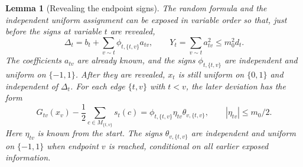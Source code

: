 \documentclass[11pt,a4paper]{article}
\newtheorem{lemma}[theorem]{Lemma}
\theoremstyle{definition}
\theoremstyle{remark}
\begin{document}
\begin{lemma}[Revealing the endpoint signs]\label{lem:random_exposure}
The random formula and the independent uniform assignment can be exposed
in variable order so that, just before the signs at variable $t$ are
revealed,
\[
 \Delta_t=b_t+\sum_{v\sim t}\phi_{t,\{t,v\}}a_{tv},
 \qquad Y_t=\sum_{v\sim t}a_{tv}^2\le m_0^2d_t.
\]
The coefficients $a_{tv}$ are already known, and the signs
$\phi_{t,\{t,v\}}$ are independent and uniform on $\{-1,1\}$. After they
are revealed, $x_t$ is still uniform on $\{0,1\}$ and independent of
$\Delta_t$.
For each edge $\{t,v\}$ with $t<v$, the later deviation has the form
\[
 G_{tv}(x_v)-\frac12\sum_{c\in M_{\{t,v\}}}s_t(c)
   =\phi_{t,\{t,v\}}\eta_{tv}\theta_{v,\{t,v\}},
 \qquad |\eta_{tv}|\le m_0/2.
\]
Here $\eta_{tv}$ is known from the start. The signs
$\theta_{v,\{t,v\}}$ are independent and uniform on $\{-1,1\}$ when
endpoint $v$ is reached, conditional on all earlier exposed information.
\end{lemma}
\end{document}

